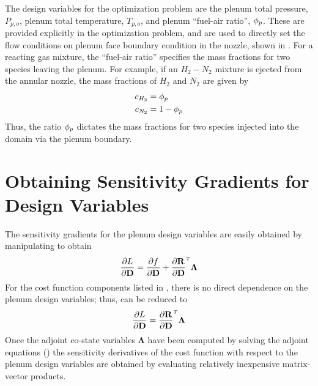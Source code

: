 The design variables for the optimization problem are the plenum total pressure,
$P_{p,o}$, plenum total temperature, $T_{p,o}$, and plenum ``fuel-air ratio'',
$\phi_p$.  These are provided explicitly in the optimization problem, and are used
to directly set the flow conditions on plenum face boundary condition in the
nozzle, shown in .  For a reacting gas mixture, the
``fuel-air ratio'' specifies the mass fractions for two species leaving the
plenum.  For example, if an $H_2-N_2$ mixture is ejected from the annular
nozzle, the mass fractions of $H_2$ and $N_2$ are given by
\begin{equation}
  \begin{aligned}
    c_{H_2} &= \phi_p \\
    c_{N_2} &= 1 - \phi_p
  \end{aligned}
  \label{fuel-air-def}
\end{equation}
Thus, the ratio $\phi_p$ dictates the mass fractions for two species injected into
the domain via the plenum boundary.

\section{Obtaining Sensitivity Gradients for Design Variables}

The sensitivity gradients for the plenum design variables are easily obtained by
manipulating  to obtain
\begin{equation}
  \pd{L}{\md} = \pd{f}{\md} + \rtdiff{}{\md} \mathbf{\Lambda}
  \label{obj-linearization1}
\end{equation}
For the cost function components listed in , there is
no direct dependence on the plenum design variables; thus,
 can be reduced to
\begin{equation}
  \pd{L}{\md} = \rtdiff{}{\md} \mathbf{\Lambda}
  \label{obj-linearization2}
\end{equation}
Once the adjoint co-state variables $\mathbf{\Lambda}$ have been computed by
solving the adjoint equations () the sensitivity derivatives
of the cost function with respect to the plenum design variables are obtained by
evaluating relatively inexpensive matrix-vector products.

